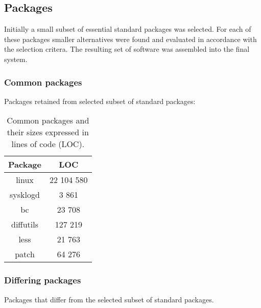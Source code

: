 \subsection{Packages}\label{Packages}

Initially a small subset of essential standard packages was selected. For each of these packages smaller alternatives were found and evaluated in accordance with the selection critera. The resulting set of software was assembled into the final system.

\subsubsection{Common packages}

Packages retained from selected subset of standard packages:

\begin{table}[!h]
    \centering
        \begin{tabular}{|c||c|}
            \hline
            Package & LOC \\
            \hline
            \hline
            linux \cite{linux} & 22 104 580 \\
            \hline
            sysklogd \cite{sysklogd} & 3 861 \\
            \hline
            bc \cite{bc} & 23 708 \\
            \hline        
            diffutils \cite{diffutils} & 127 219 \\
            \hline
            less \cite{less} & 21 763 \\
            \hline
            patch \cite{patch} & 64 276 \\
            \hline
        \end{tabular}
        \caption{Common packages and their sizes expressed in lines of code (LOC).}
\end{table}

\newpage

\subsubsection{Differing packages}

Packages that differ from the selected subset of standard packages.

